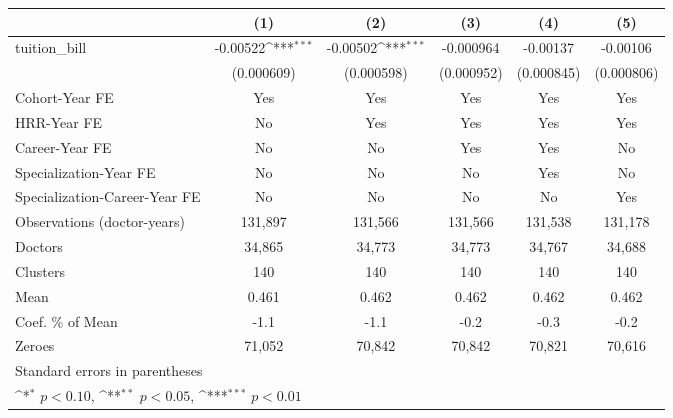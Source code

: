 {
\def\sym#1{\ifmmode^{#1}\else\(^{#1}\)\fi}
\begin{tabular}{l*{5}{c}}
\hline\hline
                    &\multicolumn{1}{c}{(1)}         &\multicolumn{1}{c}{(2)}         &\multicolumn{1}{c}{(3)}         &\multicolumn{1}{c}{(4)}         &\multicolumn{1}{c}{(5)}         \\
\hline
tuition\_bill        &    -0.00522\sym{***}&    -0.00502\sym{***}&   -0.000964         &    -0.00137         &    -0.00106         \\
                    &  (0.000609)         &  (0.000598)         &  (0.000952)         &  (0.000845)         &  (0.000806)         \\
[1em]
Cohort-Year FE      &         Yes         &         Yes         &         Yes         &         Yes         &         Yes         \\
[1em]
HRR-Year FE         &          No         &         Yes         &         Yes         &         Yes         &         Yes         \\
[1em]
Career-Year FE      &          No         &          No         &         Yes         &         Yes         &          No         \\
[1em]
Specialization-Year FE&          No         &          No         &          No         &         Yes         &          No         \\
[1em]
Specialization-Career-Year FE&          No         &          No         &          No         &          No         &         Yes         \\
\hline
Observations (doctor-years)&     131,897         &     131,566         &     131,566         &     131,538         &     131,178         \\
Doctors             &      34,865         &      34,773         &      34,773         &      34,767         &      34,688         \\
Clusters            &         140         &         140         &         140         &         140         &         140         \\
Mean                &       0.461         &       0.462         &       0.462         &       0.462         &       0.462         \\
Coef. \% of Mean    &        -1.1         &        -1.1         &        -0.2         &        -0.3         &        -0.2         \\
Zeroes              &      71,052         &      70,842         &      70,842         &      70,821         &      70,616         \\
\hline\hline
\multicolumn{6}{l}{\footnotesize Standard errors in parentheses}\\
\multicolumn{6}{l}{\footnotesize \sym{*} \(p<0.10\), \sym{**} \(p<0.05\), \sym{***} \(p<0.01\)}\\
\end{tabular}
}
